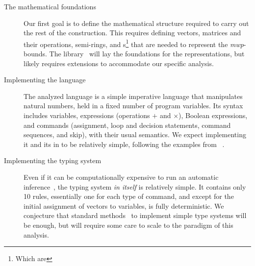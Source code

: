 \begin{description}

\item[The mathematical foundations]
Our first goal is to define the mathematical structure required to carry out the
rest of the construction. This requires defining vectors, matrices and their
operations, semi-rings, and s\footnote{Which are
} that are needed to represent the
\emph{mwp}-bounds. The 
library~\cite{mahboubi2022,mathcomp} will lay the foundations for the
 representations, but likely requires extensions to
accommodate our specific analysis.

\item[Implementing the language]
The analyzed language is a simple imperative language that manipulates natural
numbers, held in a fixed number of program variables. Its syntax includes
variables, expressions (operations \(+\) and \(\times\)), Boolean expressions,
and commands (\eg  assignment, loop and decision statements, command sequences,
and skip), with their usual semantics. We expect implementing it and its
 in  to be relatively simple, following the
examples from ~\cite{cpierce20221,cpierce20222}.

\item[Implementing the typing system]
Even if it can be computationally expensive to run an automatic
inference~\cite{aubert2023b}, the typing system \emph{in
itself} is relatively simple. It contains only 10 rules, essentially one for
each type of command, and except for the initial assignment of vectors to
variables, is fully deterministic. We conjecture that standard
methods~\cite{chlipala2022, chlipala2010} to implement simple type systems will
be enough, but will require some care to scale to the 
paradigm of this analysis.


\end{description}
